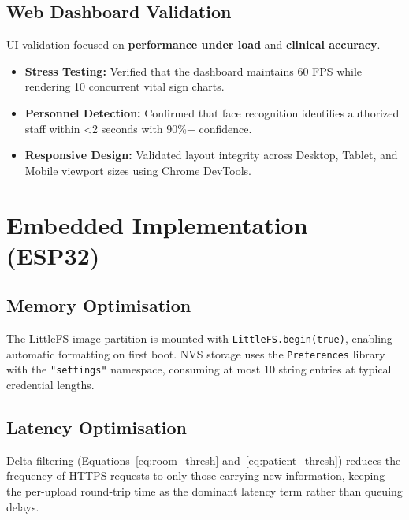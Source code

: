 \subsection{Web Dashboard Validation}
UI validation focused on \textbf{performance under load} and \textbf{clinical accuracy}.
\begin{itemize}
    \item \textbf{Stress Testing:} Verified that the dashboard maintains 60 FPS while rendering 10 concurrent vital sign charts.
    \item \textbf{Personnel Detection:} Confirmed that face recognition identifies authorized staff within <2 seconds with 90\%+ confidence.
    \item \textbf{Responsive Design:} Validated layout integrity across Desktop, Tablet, and Mobile viewport sizes using Chrome DevTools.
\end{itemize}

\section{Embedded Implementation (ESP32)}

\subsection{Memory Optimisation}

The LittleFS image partition is mounted with \texttt{LittleFS.begin(true)}, enabling automatic
formatting on first boot.
NVS storage uses the \texttt{Preferences} library with the \texttt{"settings"}
namespace, consuming at most 10 string entries at typical credential lengths.

\subsection{Latency Optimisation}

Delta filtering (Equations~\ref{eq:room_thresh} and~\ref{eq:patient_thresh}) reduces
the frequency of HTTPS requests to only those carrying new information, keeping the
per-upload round-trip time as the dominant latency term rather than queuing delays.

